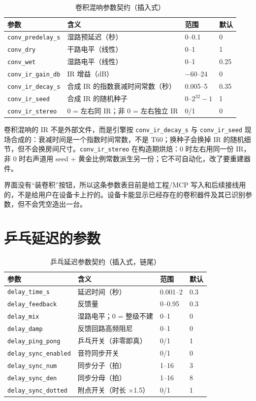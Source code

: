 \begin{table}[htbp]
\centering
\small
\begin{tabular}{@{}llll@{}}
\hline
参数 & 含义 & 范围 & 默认 \\
\hline
\texttt{conv\_predelay\_s} & 湿路预延迟（秒） & 0–0.1 & 0 \\
\texttt{conv\_dry} & 干路电平（线性） & 0–1 & 1 \\
\texttt{conv\_wet} & 湿路电平（线性） & 0–1 & 0.25 \\
\texttt{conv\_ir\_gain\_db} & IR 增益（dB） & −60–24 & 0 \\
\texttt{conv\_ir\_decay\_s} & 合成 IR 的指数衰减时间常数（秒） & 0.005–5 & 0.35 \\
\texttt{conv\_ir\_seed} & 合成 IR 的随机种子 & $0$–$2^{32}-1$ & 1 \\
\texttt{conv\_ir\_stereo} & 0 = 左右同 IR；非 0 = 左右独立 IR & 0/1 & 0 \\
\hline
\end{tabular}
\caption{卷积混响参数契约（插入式）}
\label{tab:conv-params}
\end{table}

卷积混响的 IR 不是外部文件，而是引擎按 \texttt{conv\_ir\_decay\_s} 与 \texttt{conv\_ir\_seed} 现场合成的：衰减时间是一个指数时间常数，不是 T60；换种子会换掉 IR 的随机细节，但不会换房间尺寸。\texttt{conv\_ir\_stereo} 在构造期烘焙：0 时左右用同一份 IR，非 0 时右声道用 seed + 黄金比例常数派生另一份；它不可自动化，改了要重建器件。

界面没有“装卷积”按钮，所以这条参数表目前是给工程/MCP 写入和后续接线用的，不是给用户在设备卡上拧的。设备卡能显示已经存在的卷积器件及其已识别参数，但不会凭空造出一台。

\section{乒乓延迟的参数}

\begin{table}[htbp]
\centering
\small
\begin{tabular}{@{}llll@{}}
\hline
参数 & 含义 & 范围 & 默认 \\
\hline
\texttt{delay\_time\_s} & 延迟时间（秒） & 0.001–2 & 0.3 \\
\texttt{delay\_feedback} & 反馈量 & 0–0.95 & 0.3 \\
\texttt{delay\_mix} & 湿路电平；0 = 整级不建 & 0–1 & 0 \\
\texttt{delay\_damp} & 反馈回路高频阻尼 & 0–1 & 0 \\
\texttt{delay\_ping\_pong} & 乒乓开关（非零即真） & 0/1 & 1 \\
\texttt{delay\_sync\_enabled} & 音符同步开关 & 0/1 & 0 \\
\texttt{delay\_sync\_num} & 同步分子（拍） & 1–16 & 3 \\
\texttt{delay\_sync\_den} & 同步分母（拍） & 1–16 & 8 \\
\texttt{delay\_sync\_dotted} & 附点开关（时长 ×1.5） & 0/1 & 1 \\
\hline
\end{tabular}
\caption{乒乓延迟参数契约（插入式，链尾）}
\label{tab:delay-params}
\end{table}

